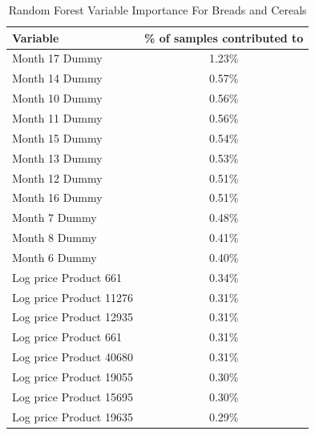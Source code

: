 \documentclass[11pt]{article}
\begin{document}
\begin{table}
    \centering
        \caption{Random Forest Variable Importance For Breads and Cereals}
        \vspace{2mm}
    \begin{tabular}{l | c } 
 \hline
  \textbf{Variable} & \textbf{\% of samples contributed to}  \\ [0.5ex] 
 \hline\hline
 Month 17 Dummy & 1.23\%   \\
 Month 14 Dummy  & 0.57\%   \\
  Month 10 Dummy  &  0.56\%  \\
  Month 11 Dummy  &  0.56\%  \\
  Month 15 Dummy  & 0.54\%   \\
  Month 13 Dummy  &  0.53\%  \\
  Month 12 Dummy  & 0.51\%   \\
  Month 16 Dummy  & 0.51\%   \\
  Month 7 Dummy  &   0.48\% \\
  Month 8 Dummy  & 0.41\%   \\
  Month 6 Dummy  &  0.40\%  \\
 Log price Product 661 &  0.34\%  \\
 Log price Product 11276  &  0.31\%  \\
 Log price Product 12935  & 0.31\%   \\
 Log price Product 661  & 0.31\%    \\
 Log price Product 40680  &  0.31\%  \\
 Log price Product 19055  &  0.30\%  \\
 Log price Product 15695  &  0.30\%  \\
  Log price Product 19635  & 0.29\%   \\

  \hline
\end{tabular}
\label{Table 4}
\end{table}
\end{document}
